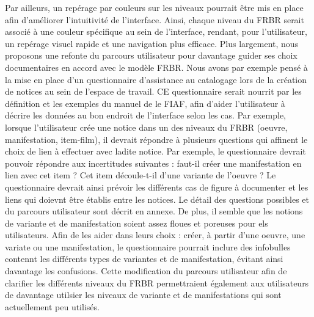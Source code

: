 Par ailleurs, un repérage par couleurs sur les niveaux pourrait être mis en place afin d'améliorer l'intuitivité de l'interface. Ainsi, chaque niveau du FRBR serait associé à une couleur spécifique au sein de l'interface, rendant, pour l'utilisateur, un repérage visuel rapide et une navigation plus efficace. 
Plus largement, nous proposons une refonte du parcours utilisateur  pour davantage guider ses choix documentaires en accord avec le modèle FRBR. Nous avons par exemple pensé à la mise en place d'un questionnaire d'assistance au catalogage lors de la création de notices au sein de l'espace de travail. CE questionnaire serait nourrit par les définition et les exemples du manuel de le FIAF, afin d'aider l'utilisateur à décrire les données au bon endroit de l'interface selon les cas. Par exemple, lorsque l'utilisateur crée une notice dans un des niveaux du FRBR (oeuvre, manifestation, item-film), il devrait répondre à plusieurs questions qui affinent le choix de lien à effectuer avec ladite notice. Par exemple, le questionnaire devrait pouvoir répondre aux incertitudes suivantes : faut-il créer une manifestation en lien avec cet item ? Cet item découle-t-il d'une variante de l'oeuvre ? Le questionnaire devrait ainsi prévoir les différents cas de figure à documenter et les liens qui doievnt être établis entre les notices. Le détail des questions possibles et  du parcours utilisateur sont décrit en annexe. De plus, il semble que les notions de variante et de manifestation soient assez floues et poreuses pour els utilisateurs. Afin de les aider dans leurs choix : créer, à partir d'une oeuvre, une variate ou une manifestation, le questionnaire pourrait inclure des infobulles contennt les différents types de variantes et de manifestation, évitant ainsi davantage les confusions. Cette modification du parcours utilisateur afin de clarifier les différents niveaux du FRBR permettraient également aux utilisateurs de davantage utilsier les niveaux de variante et de manifestations qui sont actuellement peu utilisés. 

